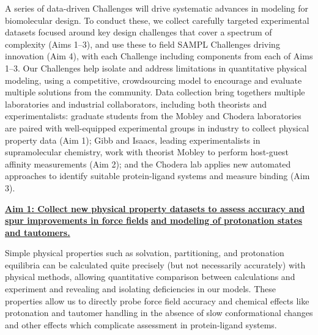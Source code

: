 \documentclass[11pt]{article}
\begin{document}
A series of data-driven Challenges will drive systematic advances in modeling for biomolecular design.
To conduct these, we collect carefully targeted experimental datasets focused around key design challenges that cover a spectrum of complexity (Aims 1--3), and use these to field SAMPL Challenges driving innovation (Aim 4), with each Challenge including components from each of Aims 1--3.
Our Challenges help isolate and address limitations in quantitative physical modeling, using a competitive, crowdsourcing model to encourage and evaluate multiple solutions from the community.
Data collection bring togethers multiple laboratories and industrial collaborators, including both theorists and experimentalists: graduate students from the Mobley and Chodera laboratories are paired with well-equipped experimental groups in industry to collect physical property data (Aim 1); Gibb and Isaacs, leading experimentalists in supramolecular chemistry, work with theorist Mobley to perform host-guest affinity measurements (Aim 2); and the Chodera lab applies new automated approaches to identify suitable protein-ligand systems and measure binding (Aim 3).


\textbf{\underline{Aim 1: Collect new physical property datasets to assess accuracy and spur improvements in force fields}}
\textbf{\underline{and modeling of protonation states and tautomers.}} 


Simple physical properties such as solvation, partitioning, and protonation equilibria can be calculated quite precisely (but not necessarily accurately) with physical methods, allowing quantitative comparison between calculations and experiment and revealing and isolating deficiencies in our models. 
These properties allow us to directly probe force field accuracy and chemical effects like protonation and tautomer handling in the absence of slow conformational changes and other effects which complicate assessment in protein-ligand systems. 
\end{document}
